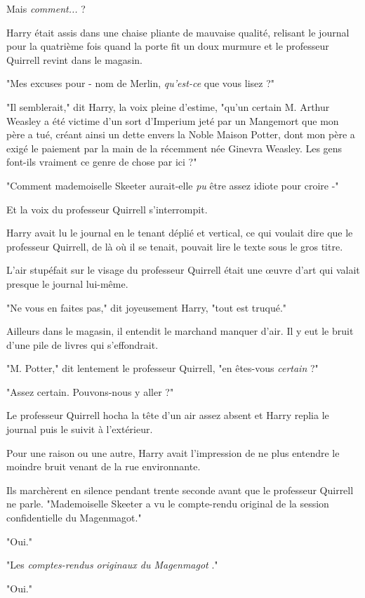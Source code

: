 Mais \emph{comment...}  ?

Harry était assis dans une chaise pliante de mauvaise qualité, relisant le journal pour la quatrième fois quand la porte fit un doux murmure et le professeur Quirrell revint dans le magasin.

"Mes excuses pour - nom de Merlin, \emph{qu'est-ce}  que vous lisez ?"

"Il semblerait," dit Harry, la voix pleine d'estime, "qu'un certain M. Arthur Weasley a été victime d'un sort d'Imperium jeté par un Mangemort que mon père a tué, créant ainsi un dette envers la Noble Maison Potter, dont mon père a exigé le paiement par la main de la récemment née Ginevra Weasley. Les gens font-ils vraiment ce genre de chose par ici ?"

"Comment mademoiselle Skeeter aurait-elle \emph{pu}  être assez idiote pour croire -"

Et la voix du professeur Quirrell s'interrompit.

Harry avait lu le journal en le tenant déplié et vertical, ce qui voulait dire que le professeur Quirrell, de là où il se tenait, pouvait lire le texte sous le gros titre.

L'air stupéfait sur le visage du professeur Quirrell était une œuvre d'art qui valait presque le journal lui-même.

"Ne vous en faites pas," dit joyeusement Harry, "tout est truqué."

Ailleurs dans le magasin, il entendit le marchand manquer d'air. Il y eut le bruit d'une pile de livres qui s'effondrait.

"M. Potter," dit lentement le professeur Quirrell, "en êtes-vous \emph{certain}  ?"

"Assez certain. Pouvons-nous y aller ?"

Le professeur Quirrell hocha la tête d'un air assez absent et Harry replia le journal puis le suivit à l'extérieur.

Pour une raison ou une autre, Harry avait l'impression de ne plus entendre le moindre bruit venant de la rue environnante.

Ils marchèrent en silence pendant trente seconde avant que le professeur Quirrell ne parle. "Mademoiselle Skeeter a vu le compte-rendu original de la session confidentielle du Magenmagot."

"Oui."

"Les \emph{comptes-rendus originaux du Magenmagot} ."

"Oui."

